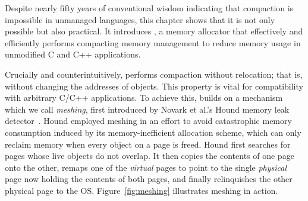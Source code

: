 

Despite nearly fifty years of conventional wisdom indicating that
compaction is impossible in unmanaged languages, this chapter shows that
it is not only possible but also practical. It introduces
\Mesh, a memory allocator that effectively and efficiently performs
compacting memory management to reduce memory usage in unmodified
C and C++ applications.

Crucially and counterintuitively, \Mesh performs compaction without
relocation; that is, without changing the addresses of objects. This
property is vital for compatibility with arbitrary C/C++
applications. To achieve this, \Mesh{} builds on a mechanism which we
call \emph{meshing}, first introduced by Novark et al.'s Hound memory
leak detector~\cite{1542521}. Hound employed meshing in an effort to avoid
catastrophic memory consumption induced by its memory-inefficient
allocation scheme, which can only reclaim memory when every object on
a page is freed. Hound first searches for pages whose live objects do
not overlap. It then copies the contents of one page onto the other,
remaps one of the \emph{virtual} pages to point to the single
\emph{physical} page now holding the contents of both pages, and
finally relinquishes the other physical page to the
OS. Figure~\ref{fig:meshing} illustrates meshing in action.


